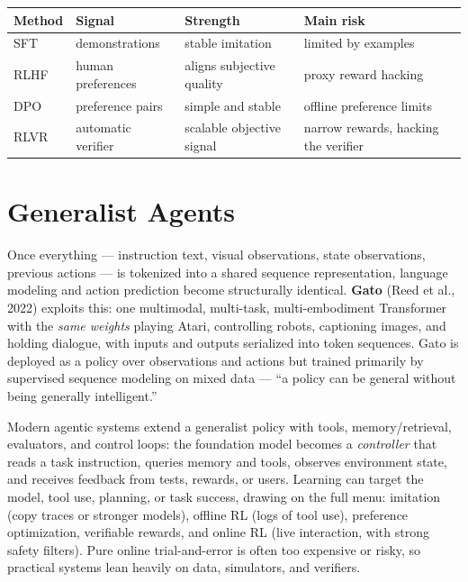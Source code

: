 \documentclass[11pt, oneside]{book}
\begin{document}
\begin{center}
\begin{tabular}{@{}llll@{}}
\toprule
\textbf{Method} & \textbf{Signal} & \textbf{Strength} & \textbf{Main risk} \\
\midrule
SFT  & demonstrations     & stable imitation         & limited by examples \\
RLHF & human preferences  & aligns subjective quality & proxy reward hacking \\
DPO  & preference pairs   & simple and stable        & offline preference limits \\
RLVR & automatic verifier & scalable objective signal & narrow rewards, hacking the verifier \\
\bottomrule
\end{tabular}
\end{center}

\section{Generalist Agents}

Once everything --- instruction text, visual observations, state observations, previous
actions --- is tokenized into a shared sequence representation, language modeling and action
prediction become structurally identical. \textbf{Gato} (Reed et al., 2022) exploits this:
one multimodal, multi-task, multi-embodiment Transformer with the \emph{same weights}
playing Atari, controlling robots, captioning images, and holding dialogue, with inputs and
outputs serialized into token sequences. Gato is deployed as a policy over observations and
actions but trained primarily by supervised sequence modeling on mixed data --- ``a policy
can be general without being generally intelligent.''

Modern agentic systems extend a generalist policy with tools, memory/retrieval, evaluators,
and control loops: the foundation model becomes a \emph{controller} that reads a task
instruction, queries memory and tools, observes environment state, and receives feedback from
tests, rewards, or users. Learning can target the model, tool use, planning, or task success,
drawing on the full menu: imitation (copy traces or stronger models), offline RL (logs of
tool use), preference optimization, verifiable rewards, and online RL (live interaction, with
strong safety filters). Pure online trial-and-error is often too expensive or risky, so
practical systems lean heavily on data, simulators, and verifiers.
\end{document}
